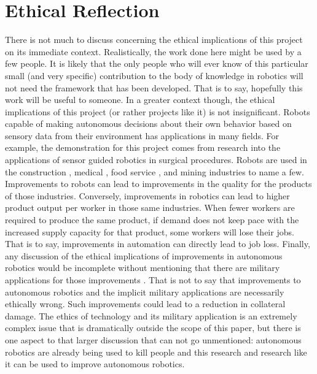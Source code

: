 \documentclass{cslthse-msc}
\begin{document}
\section{Ethical Reflection}
\label{sec:Anal_Con:Ethics_Ref}
There is not much to discuss concerning the ethical implications of this project on its immediate context. Realistically, the work done here might be used by a few people. It is likely that the only people who will ever know of this particular small (and very specific) contribution to the body of knowledge in robotics will not need the framework that has been developed. That is to say, hopefully this work will be useful to someone. In a greater context though, the ethical implications of this project (or rather projects like it) is not insignificant. Robots capable of making autonomous decisions about their own behavior based on sensory data from their environment has applications in many fields. For example, the demonstration for this project comes from research into the applications of sensor guided robotics in surgical procedures. Robots are used in the construction \cite{Ethics:Con}, medical \cite{Ethics:Med}, food service \cite{Ethics:Foo}, and mining \cite{Ethics:Min} industries to name a few. Improvements to robots can lead to improvements in the quality for the products of those industries. Conversely, improvements in robotics can lead to higher product output per worker in those same industries. When fewer workers are required to produce the same product, if demand does not keep pace with the increased supply capacity for that product, some workers will lose their jobs. That is to say, improvements in automation can directly lead to job loss. Finally, any discussion of the ethical implications of improvements in autonomous robotics would be incomplete without mentioning that there are military applications for those improvements \cite{Ethics:Mil}. That is not to say that improvements to autonomous robotics and the implicit military applications are necessarily ethically wrong. Such improvements could lead to a reduction in collateral damage. The ethics of technology and its military application is an extremely complex issue that is dramatically outside the scope of this paper, but there is one aspect to that larger discussion that can not go unmentioned: autonomous robotics are already being used to kill people and this research and research like it can be used to improve autonomous robotics.
\end{document}

